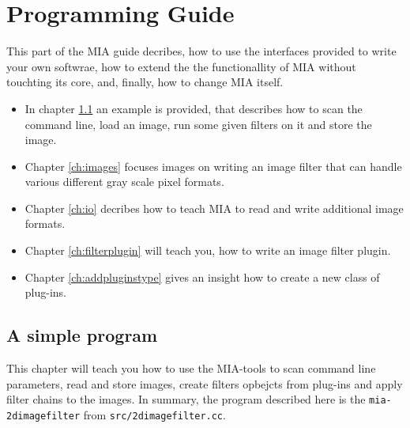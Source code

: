 


\chapter{Programming Guide}
\lstset{numbers=left, numberstyle=\small, numbersep=5pt}

This part of the MIA guide decribes, how to use the interfaces provided to write your own softwrae, 
  how to extend the the functionallity of MIA without touchting its core, and, finally, how to 
  change MIA itself. 
\begin{itemize}
\item In chapter \ref{ch:simple} an example is provided, that describes how to scan the command line, load an image, 
  run some given filters on it and store the image. 
\item Chapter \ref{ch:images} focuses images on writing an image filter that can handle various different gray scale pixel formats.
\item Chapter \ref{ch:io} decribes how to teach MIA to read and write additional image formats. 
\item Chapter \ref{ch:filterplugin} will teach you, how to write an image filter plugin. 
\item Chapter \ref{ch:addpluginstype} gives an insight how to create a new class of plug-ins.
\end{itemize}

\section{A simple program}
\label{ch:simple}

This chapter will teach you how to use the MIA-tools to scan command line parameters, read and store images, 
  create filters opbejcts from plug-ins and apply filter chains to the images. 
In summary, the program described here is the \texttt{mia-2dimagefilter} from \texttt{src/2dimagefilter.cc}. 

